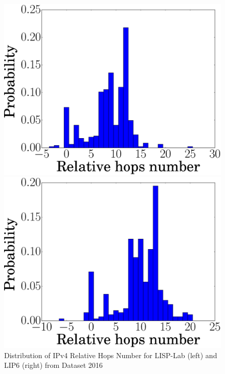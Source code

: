 \begin{figure}[!t]
	\begin{minipage}[c]{.49\linewidth}
		\begin{center}
			\includegraphics[width=\textwidth]{Pics/v4/Relative_hops_num_LISP-Lab-FranceIX_hist_changed_60.eps}
		\end{center}
	\end{minipage}
	\begin{minipage}[c]{.49\linewidth}
		\begin{center}
			\includegraphics[width=\textwidth]{Pics/v4/Relative_hops_num_LIP6-FranceIX_hist_changed_60.eps}
		\end{center}
	\end{minipage}
	\vspace{-0.5mm}
	\caption{Distribution of IPv4 Relative Hops Number for LISP-Lab (left) and LIP6 (right) from Dataset 2016}
	\label{Distribution_v4_relative_hops_num_proporation_LISP-Lab_LIP6}
\end{figure}

